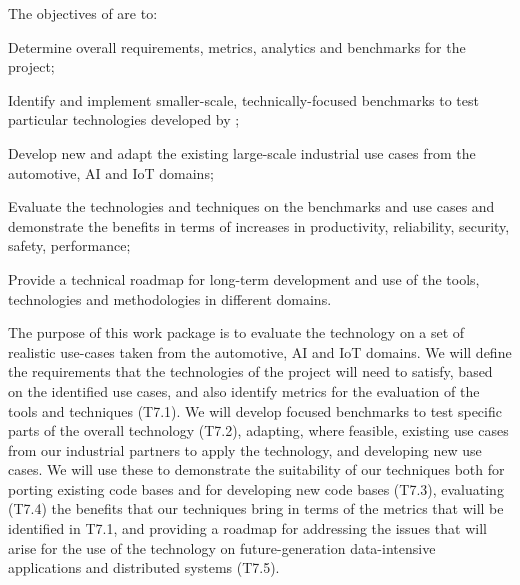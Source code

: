 \addtocounter{wpno}{1}
\begin{Workpackage}{\thewpno}
\WPTitle{\wpname{\thewpno}}


\begin{WPObjectives}
The objectives of \theWP{} are to:
\begin{compactitem}

\item Determine overall requirements, metrics, analytics and benchmarks for the \TheProject{} project;
\item Identify and implement smaller-scale, technically-focused benchmarks to test particular technologies developed by \TheProject{};
\item Develop new and adapt the existing large-scale industrial use cases from the automotive, AI and IoT domains;
\item Evaluate the \TheProject{} technologies and techniques on the benchmarks and use cases and demonstrate the benefits in terms of increases in productivity, reliability, security, safety, performance;
\item Provide a technical roadmap for long-term development and use of the \TheProject{} tools, technologies and methodologies in different domains.

\end{compactitem}
\end{WPObjectives}

\begin{WPDescription}
The purpose of this work package is to evaluate the \TheProject{} technology on a set of realistic use-cases taken from the automotive, AI and IoT domains. 
We will define the requirements that the technologies of the project will need to satisfy, based on the identified use cases, and also identify metrics for the evaluation of the \TheProject{} tools and techniques (T7.1).  We will develop focused benchmarks to test specific parts of the overall \TheProject{} technology (T7.2), adapting, where feasible, existing use cases from our industrial partners to apply the \TheProject{} technology, and developing new use cases.
We will use these to demonstrate the suitability of our techniques both 
for porting existing code bases and for developing new code bases (T7.3), 
evaluating  (T7.4) the benefits that our techniques bring in terms of the metrics that will be identified in T7.1, and providing a roadmap for addressing the issues that will arise for the use of the \TheProject{} technology on future-generation data-intensive applications and distributed systems (T7.5).


\end{WPDescription}
\end{Workpackage}

